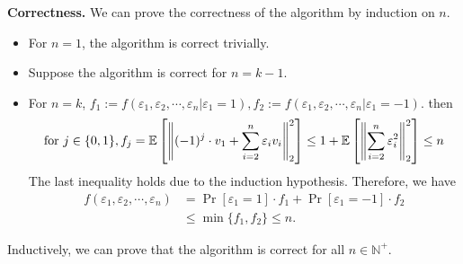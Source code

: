 \begin{answer}
\begin{enumerate}[label=\alph*).]
        \textbf{Correctness.} We can prove the correctness of the algorithm by induction on $n$. 
        \begin{itemize}
            \item For $n=1$, the algorithm is correct trivially.
            \item Suppose the algorithm is correct for $n=k-1$.
            \item For $n=k$, $f_1 := f(\varepsilon_1,\varepsilon_2,\cdots, \varepsilon_n | \varepsilon_1 = 1 ), f_2 := f(\varepsilon_1,\varepsilon_2,\cdots, \varepsilon_n | \varepsilon_1 = -1 )$.
            then 
            \begin{align*}
                \text{for } j \in \{0,1\}, f_j = \mathbb{E} \left[\norm{(-1)^j \cdot v_1 + \sum_{i=2}^{n} \varepsilon_i v_i}_2^2\right] \le 1 + \mathbb{E}\left[ \norm{\sum_{i=2}^{n} \varepsilon_i^2}_2^2 \right] \le n
            \end{align*}
            The last inequality holds due to the induction hypothesis. Therefore, we have
            \begin{align*}
                f(\varepsilon_1,\varepsilon_2,\cdots, \varepsilon_n) &= \Pr[\varepsilon_1 = 1] \cdot f_1 +  \Pr[\varepsilon_1 = -1] \cdot f_2 \\
                &\le \min\{f_1, f_2\} \le n.
            \end{align*}
        \end{itemize}
        Inductively, we can prove that the algorithm is correct for all $n \in \mathbb N^+$.
    \end{enumerate}
    \ed
\end{answer}